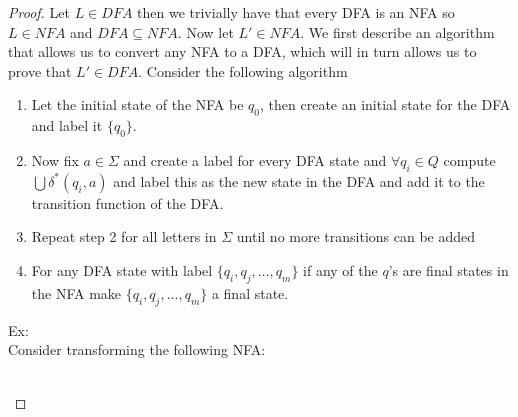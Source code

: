 \documentclass[11pt]{exam}
\begin{document}
\begin{proof}
Let $L \in DFA$ then we trivially have that every DFA is an NFA so $L \in NFA$ and $DFA \subseteq NFA$.  Now let $L' \in NFA$. We first describe an algorithm that allows us to convert any NFA to a DFA, which will in turn allows us to prove that $L' \in DFA$. Consider the following algorithm

\newpage 

\begin{enumerate}
\item Let the initial state of the NFA be $q_0$, then create an initial state for the DFA and label it $\{q_0\}$.

\item Now fix $a \in \Sigma$ and create a label for every DFA state and $\forall q_i \in Q$ compute $\bigcup \delta^*(q_i,a)$  and label this as the new state in the DFA and add it to the transition function of the DFA.

\item Repeat step 2 for all letters in $\Sigma$ until no more transitions can be added

\item For any DFA state with label $\{q_i,q_j, \dots , q_m\}$ if any of the $q$'s are final states in the NFA make $\{q_i,q_j, \dots , q_m\}$ a final state.
\end{enumerate}

Ex:\\
Consider transforming the following NFA:\\

\\



\end{proof}
\end{document}
